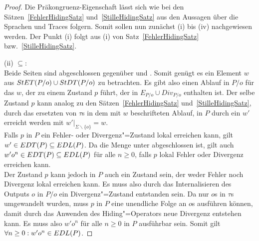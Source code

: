 \begin{proof}
  Die Präkongruenz-Eigenschaft lässt sich wie bei den
  Sätzen~\ref{FehlerHidingSatz} und~\ref{StilleHidingSatz} aus den Aussagen
  über die Sprachen und Traces folgern. Somit sollen nun zunächst (i) bis (iv)
  nachgewiesen werden. Der Punkt (i) folgt aus (i) von
  Satz~\ref{FehlerHidingSatz} bzw.~\ref{StilleHidingSatz}.

  (ii) \glqq $\subseteq$\grqq{}:\\
  Beide Seiten sind abgeschlossen gegenüber \prune{} und \cont{}. Somit genügt
  es ein Element $w$ aus $StET (P/o)\cup StDT (P/o)$ zu betrachten. Es gibt
  also einen Ablauf in $P/o$ für das $w$, der zu einem Zustand $p$ führt, der
  in $E_{P/o}\cup Div_{P/o}$ enthalten ist. Der selbe Zustand $p$ kann analog
  zu den Sätzen~\ref{FehlerHidingSatz} und~\ref{StilleHidingSatz}, durch das
  ersetzten von $\tau$s in dem mit $w$ beschrifteten Ablauf, in $P$ durch
  ein $w'$ erreicht werden mit $w'|_{\Sigma\backslash\{o\}} = w$.\\
  Falls $p$ in $P$ ein Fehler- oder Divergenz"=Zustand lokal erreichen kann,
  gilt $w'\in EDT (P)\subseteq EDL (P)$. Da die Menge \EDL{} unter \cont{}
  abgeschlossen ist, gilt auch $w'o^n\in EDT (P)\subseteq EDL (P)$ für alle
  $n\geq 0$, falls $p$ lokal Fehler oder Divergenz erreichen kann.\\
  Der Zustand $p$ kann jedoch in $P$ auch ein Zustand sein, der weder Fehler
  noch Divergenz lokal erreichen kann. Es muss also durch das Internalisieren
  des Outputs $o$ in $P/o$ ein Divergenz"=Zustand entstanden sein. Da nur $o$s
  in $\tau$s umgewandelt wurden, muss $p$ in $P$ eine unendliche Folge an $o$s
  ausführen können, damit durch das Anwenden des Hiding"=Operators neue
  Divergenz entstehen kann. Es muss also $w'o^n$ für alle $n\geq 0$ in $P$
  ausführbar sein. Somit gilt $\forall n\geq 0: w'o^n\in EDL (P)$.


\end{proof}
